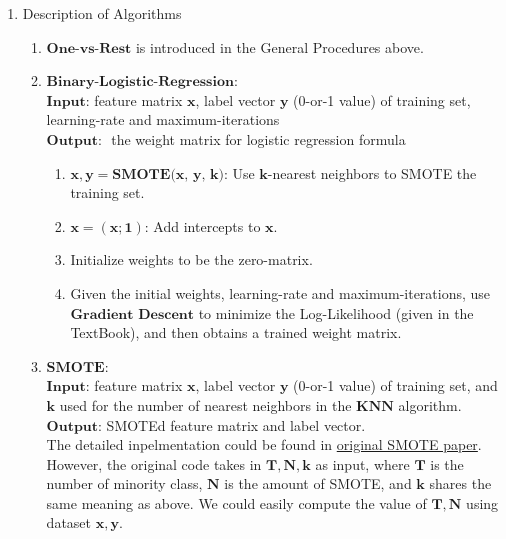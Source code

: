 \documentclass[a4paper,UTF8]{article}
\numberwithin{equation}{section}
\begin{document}
\begin{enumerate}[1.]
\item Description of Algorithms
	\begin{enumerate}[(1)]
	\item $\textbf{One-vs-Rest}$ is introduced in the General Procedures above.
	\item $\textbf{Binary-Logistic-Regression}$:\\
	$\textbf{Input:} $ feature matrix $\mathbf{x}$, label vector $\mathbf{y}$ (0-or-1 value) of training set, learning-rate and maximum-iterations\\
	$\textbf{Output: }$ the weight matrix for logistic regression formula\\
	
		\begin{enumerate}[Step 1.]
		\item $\mathbf{x , y} = \textbf{SMOTE(x, y, k)}$: Use $\mathbf{k}$-nearest neighbors to SMOTE the training set.
		\item $\mathbf{x = (x;1)}$: Add intercepts to $\mathbf{x}$. 
		\item Initialize weights to be the zero-matrix.
		\item Given the initial weights, learning-rate and maximum-iterations, use $\textbf{Gradient Descent}$ to minimize the Log-Likelihood (given in the TextBook), and then obtains a trained weight matrix.		
		\end{enumerate}
		
		
	\item $\textbf{SMOTE}$:  \\
	$\textbf{Input:} $ feature matrix $\mathbf{x}$, label vector $\mathbf{y}$ (0-or-1 value) of training set, and $\mathbf{k}$ used for the number of nearest neighbors in the $\textbf{KNN}$ algorithm.\\
	$\textbf{Output:} $ SMOTEd feature matrix and label vector.\\
	
	The detailed inpelmentation could be found in  \href{https://www.cs.cmu.edu/afs/cs/project/jair/pub/volume16/chawla02a-html/node6.html}{original SMOTE paper}. However, the original code takes in $\mathbf{T,N, k} $ as input,  where $\mathbf{T}$ is the number of minority class, $\mathbf{N}$ is the amount of SMOTE, and $\mathbf{k}$ shares the same meaning as above. We could easily compute the value of $\mathbf{T, N}$ using dataset $\mathbf{x, y}$.
	
		

	
	\end{enumerate}
	

\end{enumerate}
\end{document}
